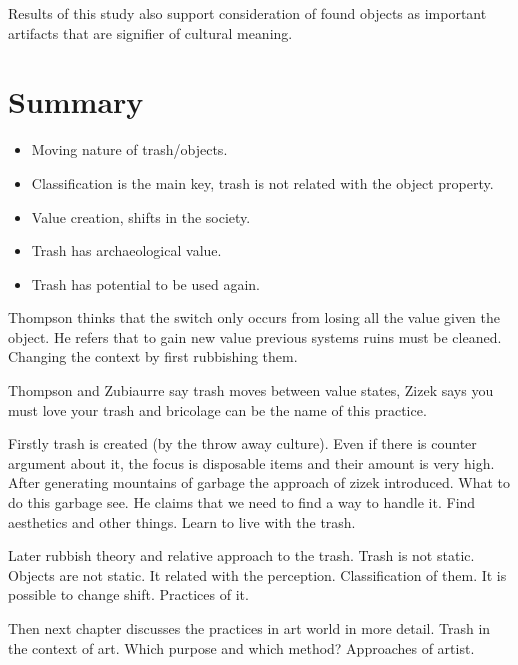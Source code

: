 Results of this study also support consideration of found objects as important artifacts that are signifier of cultural meaning.


\section{Summary}
\begin{itemize}
\item Moving nature of trash/objects.
\item Classification is the main key, trash is not related with the object property. 
\item Value creation, shifts in the society. 
\item Trash has archaeological value.
\item Trash has potential to be used again.
\end{itemize}

Thompson thinks that the switch only occurs from losing all the value given the object. He refers that to gain new value previous systems ruins must be cleaned. Changing the context by first rubbishing them.

Thompson and Zubiaurre say trash moves between value states, Zizek says you must love your trash and bricolage can be the name of this practice.

Firstly trash is created (by the throw away culture). Even if there is counter argument about it, the focus is disposable items and their amount is very high. After generating mountains of garbage the approach of zizek introduced. What to do this garbage see. He claims that we need to find a way to handle it. Find aesthetics and other things. Learn to live with the trash.


Later rubbish theory and relative approach to the trash. Trash is not static. Objects are not static. It related with the perception. Classification of them. It is possible to change shift. Practices of it.


Then next chapter discusses the practices in art world in more detail. Trash in the context of art. Which purpose and which method? Approaches of artist.

